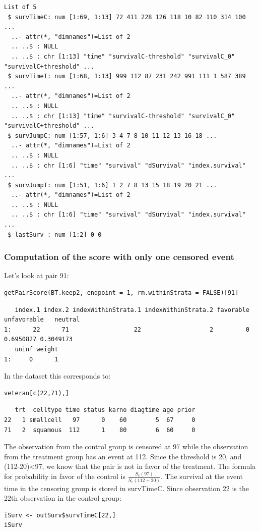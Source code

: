 \documentclass[12pt]{article}
\begin{document}
\begin{verbatim}
List of 5
 $ survTimeC: num [1:69, 1:13] 72 411 228 126 118 10 82 110 314 100 ...
  ..- attr(*, "dimnames")=List of 2
  .. ..$ : NULL
  .. ..$ : chr [1:13] "time" "survivalC-threshold" "survivalC_0" "survivalC+threshold" ...
 $ survTimeT: num [1:68, 1:13] 999 112 87 231 242 991 111 1 587 389 ...
  ..- attr(*, "dimnames")=List of 2
  .. ..$ : NULL
  .. ..$ : chr [1:13] "time" "survivalC-threshold" "survivalC_0" "survivalC+threshold" ...
 $ survJumpC: num [1:57, 1:6] 3 4 7 8 10 11 12 13 16 18 ...
  ..- attr(*, "dimnames")=List of 2
  .. ..$ : NULL
  .. ..$ : chr [1:6] "time" "survival" "dSurvival" "index.survival" ...
 $ survJumpT: num [1:51, 1:6] 1 2 7 8 13 15 18 19 20 21 ...
  ..- attr(*, "dimnames")=List of 2
  .. ..$ : NULL
  .. ..$ : chr [1:6] "time" "survival" "dSurvival" "index.survival" ...
 $ lastSurv : num [1:2] 0 0
\end{verbatim}

\subsubsection{Computation of the score with only one censored event}
\label{sec:org41ee751}

Let's look at pair 91:
\lstset{language=r,label= ,caption= ,captionpos=b,numbers=none}
\begin{lstlisting}
getPairScore(BT.keep2, endpoint = 1, rm.withinStrata = FALSE)[91]
\end{lstlisting}

\begin{verbatim}
   index.1 index.2 indexWithinStrata.1 indexWithinStrata.2 favorable unfavorable   neutral
1:      22      71                  22                   2         0   0.6950827 0.3049173
   uninf weight
1:     0      1
\end{verbatim}


In the dataset this corresponds to:
\lstset{language=r,label= ,caption= ,captionpos=b,numbers=none}
\begin{lstlisting}
veteran[c(22,71),]
\end{lstlisting}

\begin{verbatim}
   trt  celltype time status karno diagtime age prior
22   1 smallcell   97      0    60        5  67     0
71   2  squamous  112      1    80        6  60     0
\end{verbatim}


The observation from the control group is censored at 97 while the
observation from the treatment group has an event at 112. Since the
threshold is 20, and (112-20)<97, we know that the pair is not in
favor of the treatment. The formula for probability in favor of the
control is \(\frac{S_c(97)}{S_c(112+20)}\). The survival at the event
time in the censoring group is stored in survTimeC. Since observation
22 is the 22th observation in the control group:
\lstset{language=r,label= ,caption= ,captionpos=b,numbers=none}
\begin{lstlisting}
iSurv <- outSurv$survTimeC[22,] 
iSurv
\end{lstlisting}
\end{document}
